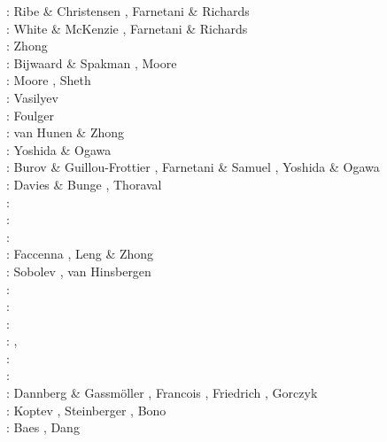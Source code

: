 \begin{scriptsize}
\nineteenninetyfour: Ribe \& Christensen \cite{rich94}, Farnetani \& Richards \cite{fari94}\\
\nineteenninetyfive: White \& McKenzie \cite{whmc95}, Farnetani \& Richards \cite{fari95}\\
\nineteenninetysix: Zhong \etal \cite{zhgm96}\\
\nineteenninetyeight: Bijwaard \& Spakman \cite{bisp98}, Moore \etal \cite{most98}\\
\nineteenninetynine: Moore \etal \cite{most99}, Sheth \cite{shet99}\\
\twothousandone: Vasilyev \etal \cite{vapy01}\\
\twothousandtwo: Foulger \cite{foul02}\\
\twothousandthree: van Hunen \& Zhong \cite{vazh03}\\
\twothousandfour: Yoshida \& Ogawa \cite{yoog04}\\
\twothousandfive: Burov \& Guillou-Frottier \cite{bugu05}, Farnetani \& Samuel \cite{fasa05}, 
                  Yoshida \& Ogawa \cite{yoog05}\\
\twothousandsix: Davies \& Bunge \cite{dabu06}, Thoraval \etal \cite{thtd06}\\
\twothousandseven: \cite{stco07}\\
\twothousandeight: \cite{uegs08}\cite{slee08}\\
\twothousandnine: \cite{bucl09}\cite{zhgy09}\cite{baiv10}\cite{tabs09}\cite{maml09}\\
\twothousandten: Faccenna \etal \cite{fabl10}, Leng \& Zhong \cite{lezh10}\\
\twothousandeleven: Sobolev \etal \cite{sosk11}, van Hinsbergen \etal \cite{vasd11}\\
\twothousandtwelve: \cite{huco12}\cite{gubc12}\cite{egim17}\\
\twothousandthirteen: \cite{bemm12}\cite{brps13}\\
\twothousandfourteen: \cite{buge14}\cite{gery14b}\cite{buto14}\cite{buit14}\cite{leli14}\\
\twothousandfifteen: \cite{bemm15}\cite{gesb15},
                     \cite{kocb15}\cite{meds15}\cite{lile15}\cite{medd15}\cite{frro15}\\
\twothousandsixteen: \cite{fige16}\cite{gadb16}\cite{kobc16}\\
\twothousandseventeen: \cite{bahf17}\cite{brsg17}\cite{bahf17}\cite{bekb17}\cite{kocb17}\\
\twothousandeighteen: Dannberg \& Gassm\"oller \cite{daga18}, Francois \etal \cite{frkc18},
                      Friedrich \etal \cite{frbr18}, Gorczyk \etal \cite{gomb18}\\
\twothousandnineteen: Koptev \etal \cite{kobg19}, Steinberger \etal \cite{stbl19},
                      Bono \etal \cite{botb19}\\
\twothousandtwenty: Baes \etal \cite{basg20,basg20b}, Dang \etal \cite{dazl20}
\end{scriptsize}

